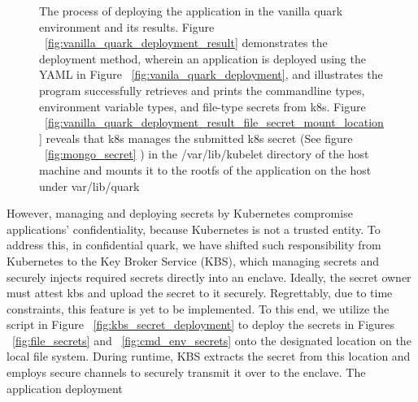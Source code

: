 \begin{figure}[H]

    
    
    \caption{The process of deploying the application in the vanilla quark environment and its results. Figure ~\ref{fig:vanilla_quark_deployment_result} demonstrates the deployment method, wherein an application is deployed using the YAML in Figure ~\ref{fig:vanila_quark_deployment}, and illustrates the program successfully retrieves and 
    prints the command\-line types, environment variable types, and file-type secrets from k8s. Figure ~\ref{fig:vanilla_quark_deployment_result_file_secret_mount_location} reveals that k8s manages the submitted k8s secret (See figure ~\ref{fig:mongo_secret} ) in the /var/lib/kubelet directory of 
    the host machine and mounts it to the rootfs of the application on the host under var/lib/quark}
    
\end{figure}
However, managing and deploying secrets by Kubernetes compromise applications’ confidentiality, because  Kubernetes is not a trusted entity. To address this, in confidential quark, we have shifted such responsibility from Kubernetes to the Key Broker Service (KBS), which managing secrets and 
securely injects required secrets directly into an enclave. Ideally, the secret owner must attest kbs and upload the secret to it securely. Regrettably, due to time constraints, this feature is yet to be implemented. To this end, we utilize the script in Figure ~\ref{fig:kbs_secret_deployment} to 
deploy the secrets in Figures ~\ref{fig:file_secrets} and ~\ref{fig:cmd_env_secrets} onto the designated location on the local file system. During runtime, KBS extracts the secret from this location and employs secure channels to securely transmit it over to the enclave. The application deployment 
